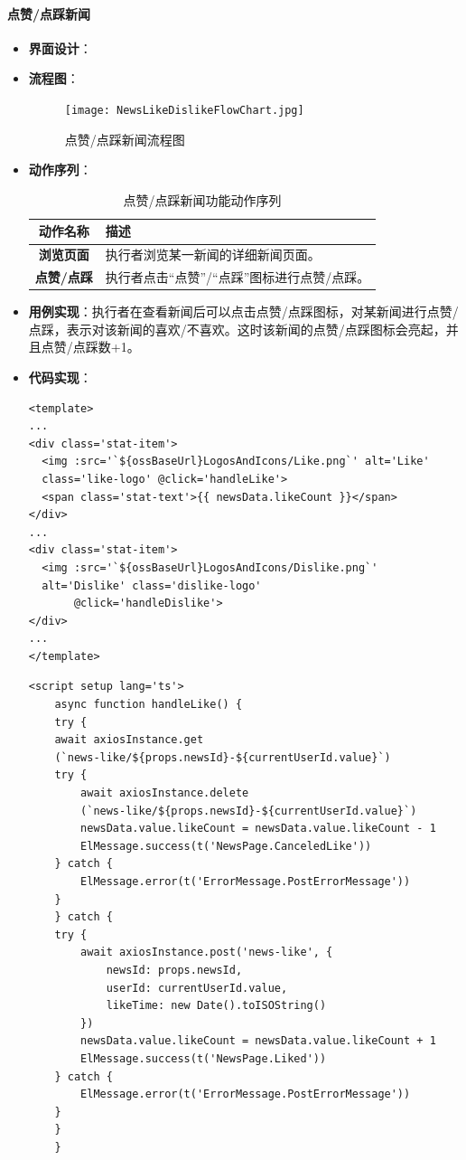 \paragraph{点赞/点踩新闻}
\begin{itemize}
	\item \textbf{界面设计}：
	\item \textbf{流程图}：
	\begin{figure}[H]
		\centering
		\texttt{[image: NewsLikeDislikeFlowChart.jpg]}
		\caption{点赞/点踩新闻流程图}
		\label{NewsLikeDislikeFlowChart}
	\end{figure}
	\item \textbf{动作序列}：
	\begin{table}[H]
		\centering
		\caption{点赞/点踩新闻功能动作序列}
		\renewcommand\arraystretch{1.5}
		\begin{tabular}{|c|>{\raggedright\arraybackslash}p{10cm}|}
			\hline
			\textbf{动作名称} & \textbf{描述} \\ \hline
			\textbf{浏览页面} & 执行者浏览某一新闻的详细新闻页面。 \\ \hline
			\textbf{点赞/点踩} & 执行者点击“点赞”/“点踩”图标进行点赞/点踩。 \\ \hline
		\end{tabular}
	\end{table}
	\item \textbf{用例实现}：执行者在查看新闻后可以点击点赞/点踩图标，对某新闻进行点赞/点踩，表示对该新闻的喜欢/不喜欢。这时该新闻的点赞/点踩图标会亮起，并且点赞/点踩数+1。
	\item \textbf{代码实现}：
	\begin{verbatim}
<template>
...
<div class='stat-item'>
  <img :src='`${ossBaseUrl}LogosAndIcons/Like.png`' alt='Like'         
  class='like-logo' @click='handleLike'>
  <span class='stat-text'>{{ newsData.likeCount }}</span>
</div>
...
<div class='stat-item'>
  <img :src='`${ossBaseUrl}LogosAndIcons/Dislike.png`' 
  alt='Dislike' class='dislike-logo'
       @click='handleDislike'>
</div>
...
</template>
	\end{verbatim}
	
	\begin{verbatim}
<script setup lang='ts'>
	async function handleLike() {
	try {
	await axiosInstance.get
	(`news-like/${props.newsId}-${currentUserId.value}`)
	try {
		await axiosInstance.delete
		(`news-like/${props.newsId}-${currentUserId.value}`)
		newsData.value.likeCount = newsData.value.likeCount - 1
		ElMessage.success(t('NewsPage.CanceledLike'))
	} catch {
		ElMessage.error(t('ErrorMessage.PostErrorMessage'))
	}
	} catch {
	try {
		await axiosInstance.post('news-like', {
			newsId: props.newsId,
			userId: currentUserId.value,
			likeTime: new Date().toISOString()
		})
		newsData.value.likeCount = newsData.value.likeCount + 1
		ElMessage.success(t('NewsPage.Liked'))
	} catch {
		ElMessage.error(t('ErrorMessage.PostErrorMessage'))
	}
	}
	}
	

\end{verbatim}
\end{itemize}
